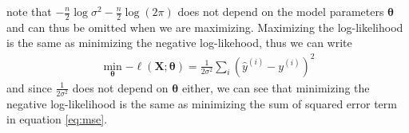 note that $-\frac{n}{2} \log \sigma^{2}-\frac{n}{2} \log (2 \pi)$ does not depend on the model parameters $\boldsymbol{\theta}$ and can thus be omitted when we are maximizing. Maximizing the log-likelihood is the same as minimizing the negative log-likehood, thus we can write 
\begin{equation*}
\begin{split}
        \min_{\boldsymbol{\boldsymbol{\theta}}}{- \ell(\mathbf{X};\boldsymbol{\theta})}=\frac{1}{2 \sigma^{2}} \sum_{i}\left(\hat{y}^{(i)}-y^{(i)}\right)^{2}
\end{split}
\end{equation*}
and since $\frac{1}{2 \sigma^{2}}$ does not depend on $\boldsymbol{\theta}$ either, we can see that minimizing the negative log-likelihood is the same as minimizing the sum of squared error term in equation \ref{eq:mse}.



